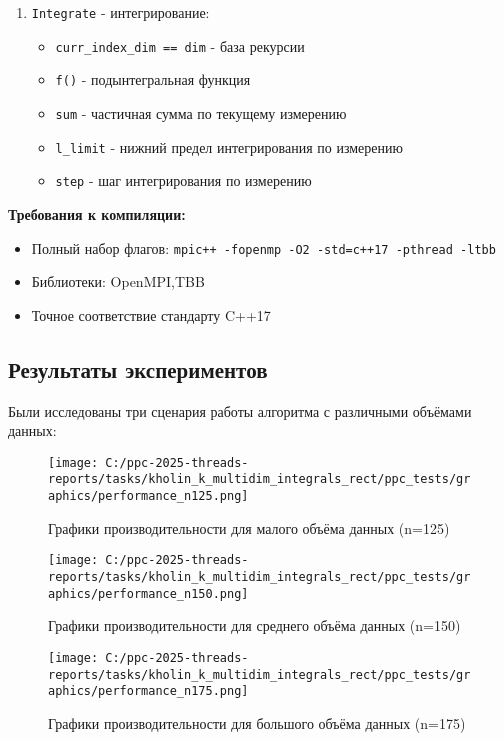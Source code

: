 \documentclass[14pt,a4paper]{article}
\begin{document}
\begin{enumerate}
\item \texttt{Integrate} - интегрирование:
  \begin{itemize}
  \item \texttt{curr\_index\_dim == dim} - база рекурсии
  \item \texttt{f()} - подынтегральная функция
  \item \texttt{sum} - частичная сумма по текущему измерению
  \item \texttt{l\_limit} - нижний предел интегрирования по измерению
  \item \texttt{step} - шаг интегрирования по измерению
  \end{itemize}
\end{enumerate}

\textbf{Требования к компиляции:}
\begin{itemize}
\item Полный набор флагов: \texttt{mpic++ -fopenmp -O2 -std=c++17 -pthread -ltbb}
\item Библиотеки: OpenMPI,TBB
\item Точное соответствие стандарту C++17
\end{itemize}

\subsection{Результаты экспериментов}
Были исследованы три сценария работы алгоритма с различными объёмами данных:

\begin{figure}[H]
\centering
\texttt{[image: C:/ppc-2025-threads-reports/tasks/kholin\_k\_multidim\_integrals\_rect/ppc\_tests/graphics/performance\_n125.png]}
\caption{Графики производительности для малого объёма данных (n=125)}
\label{fig:small}
\end{figure}

\begin{figure}[H]
\centering
\texttt{[image: C:/ppc-2025-threads-reports/tasks/kholin\_k\_multidim\_integrals\_rect/ppc\_tests/graphics/performance\_n150.png]}
\caption{Графики производительности для среднего объёма данных (n=150)}
\label{fig:medium}
\end{figure}

\begin{figure}[H]
\centering
\texttt{[image: C:/ppc-2025-threads-reports/tasks/kholin\_k\_multidim\_integrals\_rect/ppc\_tests/graphics/performance\_n175.png]}
\caption{Графики производительности для большого объёма данных (n=175)}
\label{fig:large}
\end{figure}
\end{document}
